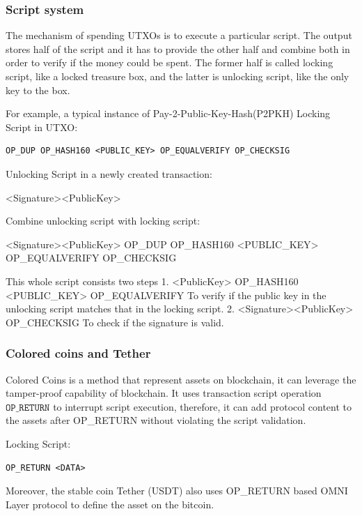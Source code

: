 \documentclass[a4paper,11pt]{article}
\begin{document}
\subsubsection*{Script system}

The mechanism of spending UTXOs is to execute a particular script. The output stores half of the script and it has to provide the other half and combine both in order to verify if the money could be spent. The former half is called locking script, like a locked treasure box, and the latter is unlocking script, like the only key to the box.

For example, a typical instance of  Pay-2-Public-Key-Hash(P2PKH)\cite{P2PKH} Locking Script in UTXO:

\begin{lstlisting}
OP_DUP OP_HASH160 <PUBLIC_KEY> OP_EQUALVERIFY OP_CHECKSIG
\end{lstlisting}

Unlocking Script in a newly created transaction:

<Signature><PublicKey>

Combine unlocking script with locking script:

<Signature><PublicKey> OP\_DUP OP\_HASH160 <PUBLIC\_KEY> OP\_EQUALVERIFY OP\_CHECKSIG

This whole script consists two steps
1. <PublicKey>  OP\_HASH160 <PUBLIC\_KEY> OP\_EQUALVERIFY
	To verify if the public key in the unlocking script matches that in the locking script.
2.  <Signature><PublicKey> OP\_CHECKSIG
	To check if the signature is valid.


\subsubsection*{Colored coins and Tether}

Colored Coins\cite{ColoredCoins} is a method that represent assets on blockchain, it can leverage the tamper-proof capability of blockchain.  It uses transaction script operation $\texttt{OP\_RETURN}$ to interrupt script execution, therefore, it can add protocol content to the assets after OP\_RETURN without violating the script validation. 

Locking Script:
\begin{lstlisting}
OP_RETURN <DATA>
\end{lstlisting}

Moreover, the stable coin Tether\cite{Tether} (USDT) also uses OP\_RETURN based OMNI Layer protocol to define the asset on the bitcoin.
\end{document}

